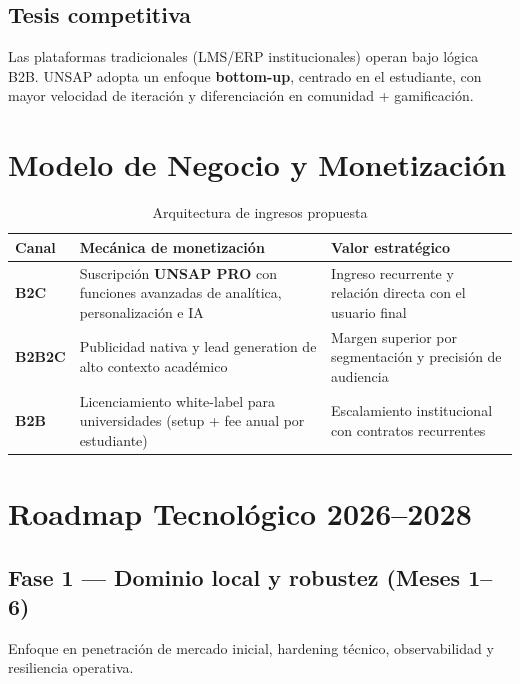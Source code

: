 \documentclass[10.5pt,a4paper]{article}
\newcommand{\tableheadrow}{\rowcolor{unsaMaroon}}
\newcommand{\tablehead}[1]{\color{white}\bfseries #1}
\begin{document}
\subsection{Tesis competitiva}

Las plataformas tradicionales (LMS/ERP institucionales) operan bajo lógica B2B. UNSAP adopta un enfoque \textbf{bottom-up}, centrado en el estudiante, con mayor velocidad de iteración y diferenciación en comunidad + gamificación.


\section{Modelo de Negocio y Monetización}

\begin{table}[htbp]
\centering
\caption{Arquitectura de ingresos propuesta}
\begin{tabularx}{\textwidth}{>{\bfseries}p{2.2cm} X X}
\tableheadrow
  \tablehead{Canal} & \tablehead{Mecánica de monetización} & \tablehead{Valor estratégico} \\
\midrule
\rowcolor{white}
B2C &
  Suscripción \textbf{UNSAP PRO} con funciones avanzadas de analítica, personalización e IA &
  Ingreso recurrente y relación directa con el usuario final \\
\rowcolor{unsaLight}
B2B2C &
  Publicidad nativa y lead generation de alto contexto académico &
  Margen superior por segmentación y precisión de audiencia \\
\rowcolor{white}
B2B &
  Licenciamiento white-label para universidades (setup + fee anual por estudiante) &
  Escalamiento institucional con contratos recurrentes \\
\bottomrule
\end{tabularx}
\end{table}


\section{Roadmap Tecnológico 2026--2028}

\subsection{Fase 1 — Dominio local y robustez \normalfont\small(Meses 1–6)}
Enfoque en penetración de mercado inicial, hardening técnico, observabilidad y resiliencia operativa.
\end{document}
